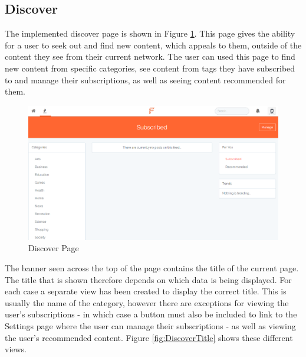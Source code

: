 \subsection{Discover}
The implemented discover page is shown in Figure \ref{fig:DiscoverPage}. This page gives the ability for a user to seek out and find new content, which appeals to them, outside of the content they see from their current network. The user can used this page to find new content from specific categories, see content from tags they have subscribed to and manage their subscriptions, as well as seeing content recommended for them.

\begin{figure}[H]
\centering
\includegraphics[width=\textwidth]{Images/Implementation/DiscoverPage}
\caption{Discover Page}
\label{fig:DiscoverPage}
\end{figure}

The banner seen across the top of the page contains the title of the current page. The title that is shown therefore depends on which data is being displayed. For each case a separate view has been created to display the correct title. This is usually the name of the category, however there are exceptions for viewing the user's subscriptions - in which case a button must also be included to link to the Settings page where the user can manage their subscriptions - as well as viewing the user's recommended content. Figure \ref{fig:DiscoverTitle} shows these different views.

